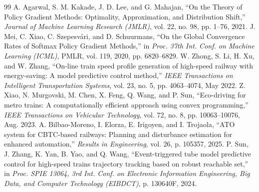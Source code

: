 \documentclass[10pt,a4paper]{article}
\begin{document}
\begin{thebibliography}{99}
 A. Agarwal, S. M. Kakade, J. D. Lee, and G. Mahajan, ``On the Theory of Policy Gradient Methods: Optimality, Approximation, and Distribution Shift,'' \textit{Journal of Machine Learning Research (JMLR)}, vol. 22, no. 98, pp. 1--76, 2021.
 J. Mei, C. Xiao, C. Szepesv\'{a}ri, and D. Schuurmans, ``On the Global Convergence Rates of Softmax Policy Gradient Methods,'' in \textit{Proc. 37th Int. Conf. on Machine Learning (ICML)}, PMLR, vol. 119, 2020, pp. 6820--6829.
 W. Zhong, S. Li, H. Xu, and W. Zhang, ``On-line train speed profile generation of high-speed railway with energy-saving: A model predictive control method,'' \textit{IEEE Transactions on Intelligent Transportation Systems}, vol. 23, no. 5, pp. 4063--4074, May 2022.
 Z. Xiao, N. Murgovski, M. Chen, X. Feng, Q. Wang, and P. Sun, ``Eco-driving for metro trains: A computationally efficient approach using convex programming,'' \textit{IEEE Transactions on Vehicular Technology}, vol. 72, no. 8, pp. 10063--10076, Aug. 2023.
 A. Bilbao-Moreno, I. Elorza, E. Irigoyen, and I. Trojaola, ``ATO system for CBTC-based railways: Planning and disturbance estimation for enhanced automation,'' \textit{Results in Engineering}, vol. 26, p. 105357, 2025.
 P. Sun, J. Zhang, K. Yan, B. Yao, and Q. Wang, ``Event-triggered tube model predictive control for high-speed trains trajectory tracking based on robust reachable set,'' in \textit{Proc. SPIE 13064, 3rd Int. Conf. on Electronic Information Engineering, Big Data, and Computer Technology (EIBDCT)}, p. 130640F, 2024.
\end{thebibliography}
\end{document}
